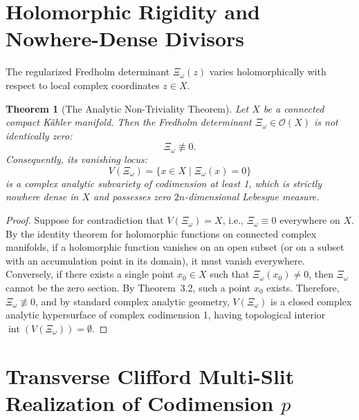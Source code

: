 \documentclass[11pt,a4paper]{article}
\newtheorem{theorem}{Theorem}[section]
\theoremstyle{definition}
\begin{document}
\section{Holomorphic Rigidity and Nowhere-Dense Divisors}

The regularized Fredholm determinant $\Xi_\omega(z)$ varies holomorphically with respect to local complex coordinates $z \in X$.
\begin{theorem}[The Analytic Non-Triviality Theorem]
Let $X$ be a connected compact K\"ahler manifold. Then the Fredholm determinant $\Xi_\omega \in \mathcal{O}(X)$ is not identically zero:
\begin{equation}
  \Xi_\omega \not\equiv 0.
\end{equation}
Consequently, its vanishing locus:
\begin{equation}
  V(\Xi_\omega) = \{ x \in X \mid \Xi_\omega(x) = 0 \}
\end{equation}
is a complex analytic subvariety of codimension at least 1, which is strictly nowhere dense in $X$ and possesses zero $2n$-dimensional Lebesgue measure.
\end{theorem}
\begin{proof}
Suppose for contradiction that $V(\Xi_\omega) = X$, i.e., $\Xi_\omega \equiv 0$ everywhere on $X$. By the identity theorem for holomorphic functions on connected complex manifolds, if a holomorphic function vanishes on an open subset (or on a subset with an accumulation point in its domain), it must vanish everywhere. Conversely, if there exists a single point $x_0 \in X$ such that $\Xi_\omega(x_0) \neq 0$, then $\Xi_\omega$ cannot be the zero section. By Theorem~3.2, such a point $x_0$ exists. Therefore, $\Xi_\omega \not\equiv 0$, and by standard complex analytic geometry, $V(\Xi_\omega)$ is a closed complex analytic hypersurface of complex codimension 1, having topological interior $\operatorname{int}(V(\Xi_\omega)) = \emptyset$.
\end{proof}

\section{Transverse Clifford Multi-Slit Realization of Codimension $p$}
\end{document}
